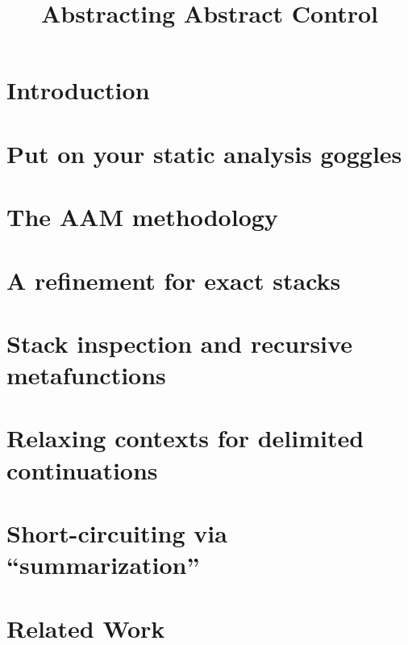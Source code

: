 \documentclass[preprint,nocopyrightspace]{sigplanconf}
\title{Abstracting Abstract Control}
\begin{document}
\maketitle


\begin{abstract}

\end{abstract}

\section{Introduction}

\section{Put on your static analysis goggles}\label{sec:analysis} 

\section{The AAM methodology}
\label{sec:aam}

\section{A refinement for exact stacks}\label{sec:pushdown}

\section{Stack inspection and recursive metafunctions}
\label{sec:inspection}

\section{Relaxing contexts for delimited continuations}\label{sec:delim}

\section{Short-circuiting via ``summarization''}\label{sec:memo}

\section{Related Work}

\end{document}
